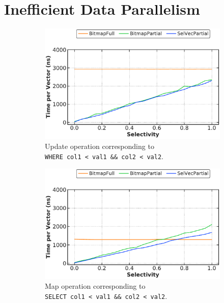 \documentclass[12pt]{cmuthesis}
\begin{document}
\section{Inefficient Data Parallelism}
\label{inefficientsimd}
\begin{figure}[t!]
\centering
\begin{subfigure}[t]{.49\linewidth}
 \centering
 \includegraphics[width=0.9\linewidth]{eval/logical_and_update.pdf}
 \caption{Update operation corresponding to \\ \texttt{\footnotesize WHERE col1 < val1 \&\& col2 < val2}.}
  \label{fig:logical_and_update}
\end{subfigure}%
\begin{subfigure}[t]{.49\linewidth}
 \centering
 \includegraphics[width=0.9\linewidth]{eval/logical_and_map.pdf}
 \caption{Map operation corresponding to \\ \texttt{\footnotesize SELECT col1 < val1 \&\& col2 < val2}.}
  \label{fig:logical_and_map}
\end{subfigure}
\begin{subfigure}[t]{.49\linewidth}
 \centering

\end{subfigure}
\end{figure}
\end{document}
